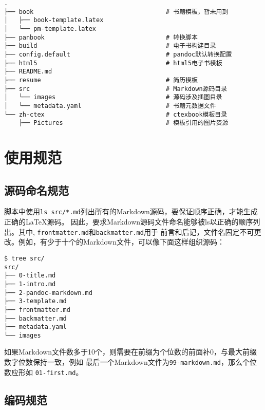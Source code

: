 \documentclass[fancyhdr,bookmark]{ctexbook}
\newcommand{\passthrough}[1]{#1}
\begin{document}
\begin{lstlisting}
.
├── book                                    # 书籍模板，暂未用到
│   ├── book-template.latex
│   └── pm-template.latex
├── panbook                                 # 转换脚本
├── build                                   # 电子书构建目录
├── config.default                          # pandoc默认转换配置
├── html5                                   # html5电子书模板
├── README.md
├── resume                                  # 简历模板
├── src                                     # Markdown源码目录
│   └── images                              # 源码涉及插图目录
│   └── metadata.yaml                       # 书籍元数据文件
└── zh-ctex                                 # ctexbook模板目录
    ├── Pictures                            # 模板引用的图片资源
\end{lstlisting}

\hypertarget{ux4f7fux7528ux89c4ux8303}{%
\section{使用规范}\label{ux4f7fux7528ux89c4ux8303}}

\hypertarget{ux6e90ux7801ux547dux540dux89c4ux8303}{%
\subsection{源码命名规范}\label{ux6e90ux7801ux547dux540dux89c4ux8303}}

脚本中使用\passthrough{\lstinline!ls src/*.md!}列出所有的Markdown源码，要保证顺序正确，才能生成正确的LaTeX源码。
因此，要求Markdown源码文件命名能够被ls以正确的顺序列出。其中,
\passthrough{\lstinline!frontmatter.md!}和\passthrough{\lstinline!backmatter.md!}用于
前言和后记，文件名固定不可更改。例如，有少于十个的Markdown文件，可以像下面这样组织源码：

\begin{lstlisting}
$ tree src/
src/
├── 0-title.md
├── 1-intro.md
├── 2-pandoc-markdown.md
├── 3-template.md
├── frontmatter.md
├── backmatter.md
├── metadata.yaml
└── images
\end{lstlisting}

如果Markdown文件数多于10个，则需要在前缀为个位数的前面补0，与最大前缀数字位数保持一致，例如
最后一个Markdown文件为\passthrough{\lstinline!99-markdown.md!}，那么个位数应形如
\passthrough{\lstinline!01-first.md!}。

\hypertarget{ux7f16ux7801ux89c4ux8303}{%
\subsection{编码规范}\label{ux7f16ux7801ux89c4ux8303}}
\end{document}
